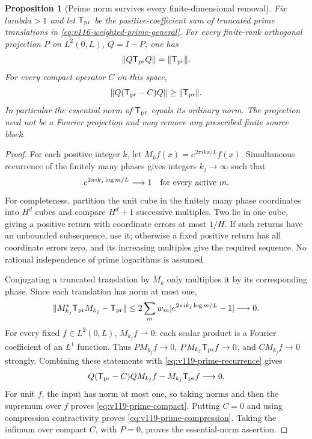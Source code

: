 \documentclass[11pt]{article}
\def\lambda{lambda}%
\newtheorem{proposition}[theorem]{Proposition}
\theoremstyle{remark}
\begin{document}
\begin{proposition}[Prime norm survives every finite-dimensional removal]
\label{prop:v119-prime-essential}
Fix $\lambda>1$ and let $\mathsf T_{\rm pr}$ be the positive-coefficient
sum of truncated prime translations in
\eqref{eq:v116-weighted-prime-general}.  For every finite-rank
orthogonal projection $P$ on $L^2(0,L)$, $Q=I-P$, one has
\begin{equation}\label{eq:v119-prime-compression}
 \|Q\mathsf T_{\rm pr}Q\|=\|\mathsf T_{\rm pr}\|.
\end{equation}
For every compact operator $C$ on this space,
\begin{equation}\label{eq:v119-prime-compact}
 \|Q(\mathsf T_{\rm pr}-C)Q\|\ge\|\mathsf T_{\rm pr}\|.
\end{equation}
In particular the essential norm of $\mathsf T_{\rm pr}$ equals its
ordinary norm.  The projection need not be a Fourier projection and
may remove any prescribed finite source block.
\end{proposition}
\begin{proof}
For each positive integer $k$, let
$M_k f(x)=e^{2\pi ikx/L}f(x)$.  Simultaneous recurrence of the finitely
many phases gives integers $k_j\to\infty$ such that
\[
 e^{2\pi ik_j\log m/L}\longrightarrow1
 \quad\hbox{for every active }m.
\]
For completeness, partition the unit cube in the finitely many phase
coordinates into $H^d$ cubes and compare $H^d+1$ successive multiples.
Two lie in one cube, giving a positive return with coordinate errors
at most $1/H$.  If such returns have an unbounded subsequence, use it;
otherwise a fixed positive return has all coordinate errors zero,
and its increasing multiples give the required sequence.  No rational
independence of prime logarithms is assumed.

Conjugating a truncated translation by $M_k$ only multiplies it by
its corresponding phase.  Since each translation has norm at most one,
\begin{equation}\label{eq:v119-prime-recurrence}
 \|M_{k_j}^*\mathsf T_{\rm pr}M_{k_j}-\mathsf T_{\rm pr}\|
 \le2\sum_m w_m|e^{2\pi ik_j\log m/L}-1|\longrightarrow0.
\end{equation}
For every fixed $f\in L^2(0,L)$, $M_{k_j}f\rightharpoonup0$:
each scalar product is a Fourier coefficient of an $L^1$ function.
Thus $PM_{k_j}f\to0$, $PM_{k_j}\mathsf T_{\rm pr}f\to0$, and
$CM_{k_j}f\to0$ strongly.  Combining these statements with
\eqref{eq:v119-prime-recurrence} gives
\[
 Q(\mathsf T_{\rm pr}-C)Q M_{k_j}f
       -M_{k_j}\mathsf T_{\rm pr}f\longrightarrow0.
\]
For unit $f$, the input has norm at most one, so taking norms and then
the supremum over $f$ proves \eqref{eq:v119-prime-compact}.
Putting $C=0$ and using compression contractivity proves
\eqref{eq:v119-prime-compression}.  Taking the infimum over compact
$C$, with $P=0$, proves the essential-norm assertion.
\end{proof}
\end{document}
